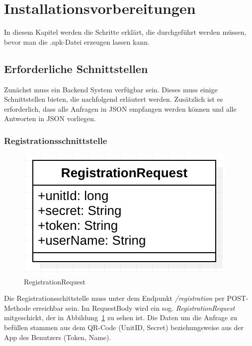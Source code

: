 \section{Installationsvorbereitungen}
\label{sec:installation}
In diesem Kapitel werden die Schritte erklärt, die durchgeführt werden müssen, bevor man die .apk-Datei erzeugen lassen kann.

\subsection{Erforderliche Schnittstellen}
Zunächst muss ein Backend System verfügbar sein. Dieses muss einige Schnittstellen bieten, die nachfolgend erläutert werden. Zusätzlich ist es erforderlich, dass alle Anfragen in JSON empfangen werden können und alle Antworten in JSON vorliegen.

\subsubsection{Registrationsschnittstelle}
\begin{figure}[h]
	\centering
	\includegraphics{include/img/registrationrequest}
	\caption{RegistrationRequest}
	\label{fig:registrationrequest}
\end{figure}

Die Registrationsschittstelle muss unter dem Endpunkt \textit{/registration} per POST-Methode erreichbar sein. Im RequestBody wird ein sog. \textit{RegistrationRequest} mitgeschickt, der in Abbildung~\ref{fig:registrationrequest} zu sehen ist. Die Daten um die Anfrage zu befüllen stammen aus dem QR-Code (UnitID, Secret) beziehungsweise aus der App des Benutzers (Token, Name).

